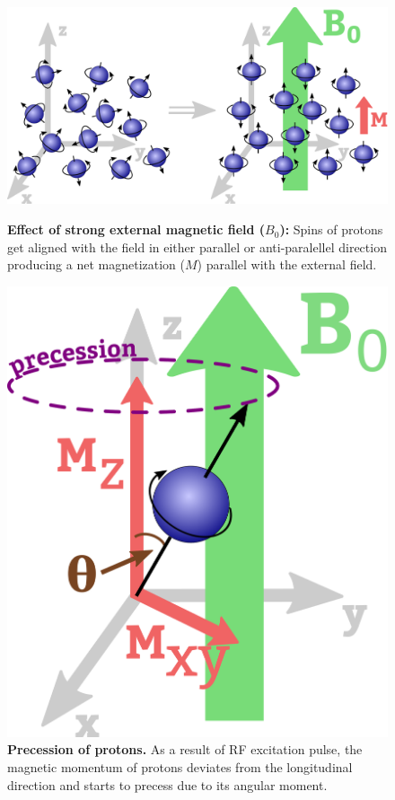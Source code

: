 \begin{figure}[thb]
    \centering
    \begin{minipage}{.52\textwidth}
        \centering
        \includegraphics[width=0.8\linewidth]{images/net_magnetization.pdf}
        \caption{\textbf{Effect of strong external magnetic field ($B_0$):} Spins of protons get aligned with the field in either parallel or anti-paralellel direction producing a net magnetization ($M$) parallel with the external field.}
        \label{fig:net_magnetization}
    \end{minipage}%
    \hspace{0.03\textwidth}
    \begin{minipage}{0.44\textwidth}
        \centering
        \includegraphics[width=0.4\linewidth]{images/precession.pdf}
        \caption{\textbf{Precession of protons.} As a result of RF excitation pulse, the magnetic momentum of protons deviates from the longitudinal direction and starts to precess due to its angular moment.}
        \label{fig:precession}
    \end{minipage}
\end{figure}


